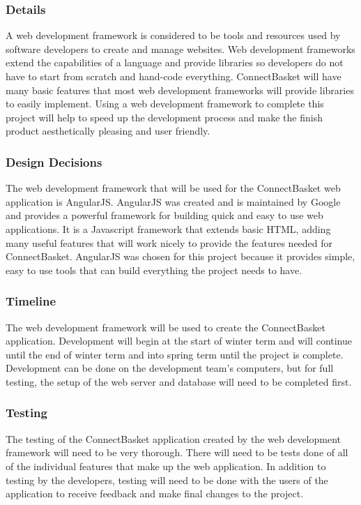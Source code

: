 \documentclass[onecolumn, draftclsnofoot,10pt, compsoc]{IEEEtran}
\begin{document}
\subsubsection{Details}
A web development framework is considered to be tools and resources used by software developers to create and manage websites. Web development frameworks extend the capabilities of a language and provide libraries so developers do not have to start from scratch and hand-code everything. ConnectBasket will have many basic features that most web development frameworks will provide libraries to easily implement. Using a web development framework to complete this project will help to speed up the development process and make the finish product aesthetically pleasing and user friendly.

\subsubsection{Design Decisions}
The web development framework that will be used for the ConnectBasket web application is AngularJS. AngularJS was created and is maintained by Google and provides a powerful framework for building quick and easy to use web applications. It is a Javascript framework that extends basic HTML, adding many useful features that will work nicely to provide the features needed for ConnectBasket. AngularJS was chosen for this project because it provides simple, easy to use tools that can build everything the project needs to have.


\subsubsection{Timeline}
The web development framework will be used to create the ConnectBasket application. Development will begin at the start of winter term and will continue until the end of winter term and into spring term until the project is complete. Development can be done on the development team’s computers, but for full testing, the setup of the web server and database will need to be completed first.


\subsubsection{Testing}
The testing of the ConnectBasket application created by the web development framework will need to be very thorough. There will need to be tests done of all of the individual features that make up the web application. In addition to testing by the developers, testing will need to be done with the users of the application to receive feedback and make final changes to the project.
\end{document}
